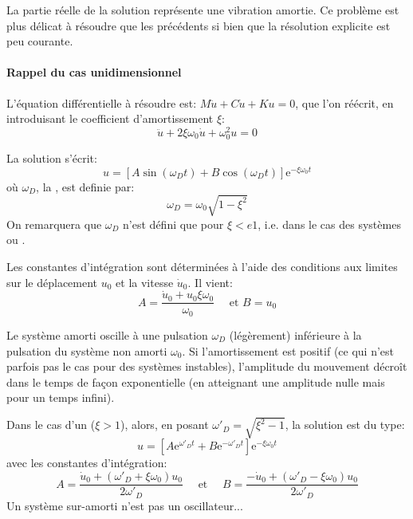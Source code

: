 La partie réelle de la solution représente une vibration amortie.
Ce problème est plus délicat à résoudre que les précédents si bien que la résolution
explicite est peu courante.

\medskip
{}
\paragraph{Rappel du cas unidimensionnel}
L'équation différentielle à résoudre est: $M\ddot{u}+C\dot{u}+Ku=0$, que l'on
réécrit, en introduisant le coefficient d'amortissement $\xi$:
\begin{equation}\ddot{u}+2\xi\omega_0\dot{u}+\omega^2_0 u=0\end{equation}

La solution s'écrit: \begin{equation} u=\left[A\sin (\omega_D t)+B\cos(\omega_D t)\right] \mathrm{e}^{-\xi\omega_0t} \end{equation}
où $\omega_D$, la , est definie par:
\begin{equation}\omega_D=\omega_0\sqrt{1-\xi^2}\end{equation}
On remarquera que $\omega_D$ n'est défini que pour $\xi<e1$, i.e.
dans le cas des systèmes  ou .

Les constantes d'intégration sont déterminées à l'aide des conditions aux limites sur le déplacement $u_0$ et la
vitesse $\dot{u}_0$. Il vient: \begin{equation} A=\dfrac{\dot{u}_0+u_0\xi\omega_0}{\omega_0} \quad \text{ et } B=u_0\end{equation}

Le système amorti oscille à une pulsation $\omega_D$ (légèrement) inférieure à la pulsation du
système non amorti $\omega_0$. Si l'amortissement est positif (ce qui n’est parfois pas le cas
pour des systèmes instables), l'amplitude du mouvement décroît dans le temps de façon
exponentielle (en atteignant une amplitude nulle mais pour un temps infini).

\medskip
Dans le cas d'un  ($\xi>1$), alors, en posant $\omega'_D=\sqrt{\xi^2-1}$, la solution est du type:
\begin{equation} u=\left[A\mathrm{e}^{\omega'_D t}+B\mathrm{e}^{-\omega'_D t}\right] \mathrm{e}^{-\xi\omega_0t} \end{equation}
avec les constantes d'intégration:
\begin{equation}A=\dfrac{\dot{u}_0+(\omega'_D+\xi\omega_0)u_0}{2\omega'_D} \quad \text{ et }\quad
B=\dfrac{-\dot{u}_0+(\omega'_D-\xi\omega_0)u_0}{2\omega'_D} \end{equation}
Un système sur-amorti n'est pas un oscillateur...


